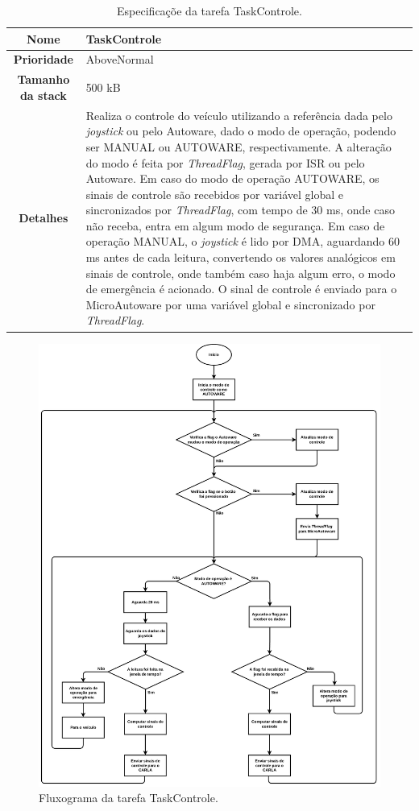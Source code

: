 \begin{table}[H]
	\centering
	\begin{tabular}{c|p{11.5cm}}
	\textbf{Nome} & TaskControle \\
	\hline
	\textbf{Prioridade}& AboveNormal \\
	\hline
	\textbf{Tamanho da stack} & 500 kB \\
	\hline
	\textbf{Detalhes} & Realiza o controle do veículo utilizando a referência dada pelo \textit{joystick} ou pelo Autoware, dado o modo de operação, podendo ser MANUAL ou AUTOWARE, respectivamente. A alteração do modo é feita por \textit{ThreadFlag}, gerada por ISR ou pelo Autoware. Em caso do modo de operação AUTOWARE, os sinais de controle são recebidos por variável global e sincronizados por \textit{ThreadFlag}, com tempo de 30 ms, onde caso não receba, entra em algum modo de segurança. Em caso de operação MANUAL,  o \textit{joystick} é lido por DMA, aguardando 60 ms antes de cada leitura,  convertendo os valores analógicos em sinais de controle, onde também caso haja algum erro, o modo de emergência é acionado. O sinal de controle é enviado para o MicroAutoware por uma variável global e sincronizado por \textit{ThreadFlag}. 
	\end{tabular}
	\caption{Especificaçõe da tarefa TaskControle.}
	\label{tab:taskcontrole}
\end{table}

\begin{figure}[H]
	\centering
	\includegraphics[height= 0.8\textheight]{img/fluxograma_taskcontrole}
	\caption{Fluxograma da tarefa TaskControle.}
	\label{fig:fluxograma_taskcontrole}
\end{figure}


